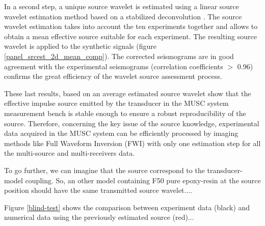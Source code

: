 \documentclass[manuscript,revised]{geophysics}
\begin{document}

\noindent In a second step, a unique source wavelet is estimated using a linear source wavelet estimation method based on a stabilized deconvolution \citep{Pratt_FWI_1999}. The source wavelet estimation takes into account the ten experiments together and allows to obtain a mean effective source suitable for each experiment. The resulting source wavelet is applied to the synthetic signals (figure \ref{panel_srcest_2d_mean_comp}). The corrected seismograms are in good agreement with the experimental seismograms (correlation coefficients $\mathrm{>}$ 0.96) confirms the great efficiency of the wavelet source assessment process.  

\noindent These last results, based on an average estimated source wavelet show that the effective impulse source emitted by the transducer in the MUSC system measurement bench is stable enough to ensure a robust reproducibility of the source. Therefore, concerning the key issue of the source knowledge, experimental data acquired in the MUSC system can be efficiently processed by imaging methods like Full Waveform Inversion (FWI) with only one estimation step for all the multi-source and multi-receivers data.

\noindent To go further, we can imagine that the source correspond to the transducer-model coupling. So, an other model containing F50 pure epoxy-resin at the source position should have the same transmitted source wavelet....

\noindent Figure \ref{blind-test} shows the comparison between experiment data (black) and numerical data using the previously estimated source (red)...
\end{document}
